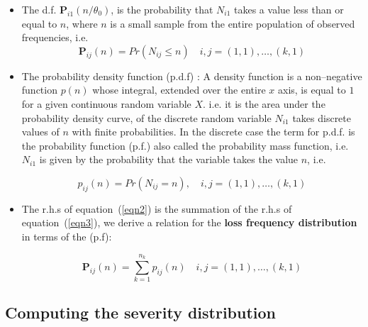\documentclass[]{DissertateUSU}
\begin{document}
\begin{itemize}
\item The d.f. \begin{math}\mathbf{P}_{i1}(n/\theta_0)  \end{math}, is the probability that $N_{i1}$ takes a value less than or equal to $n$, where $n$ is a small sample from the entire population of observed frequencies, i.e.
\singlespacing
\begin{equation}\label{eqn2}
\mathbf{P}_{ij}(n)=Pr \left(N_{ij}\leq n \right) \quad{i,j}= (1,1),\ldots, (k,1)
\end{equation}
\doublespacing

\item The probability density function (p.d.f) : A density function is a non--negative function $p(n)$ whose integral, extended over the entire $x$ axis, is equal to $1$ for a given continuous random variable $X$. i.e. it is the area under the probability density curve, of the discrete random variable $N_{i1}$ takes discrete values of $n$ with finite probabilities. In the discrete case the term for p.d.f. is the probability function (p.f.) also called the probability mass function, i.e. $N_{i1}$ is given by the probability that the variable takes the value $n$, i.e.

\singlespacing
\begin{equation}\label{eqn3}
p_{ij}(n)=Pr\left(N_{ij} = n\right), \quad{i,j}= (1,1),\ldots, (k,1) 
\end{equation} 
\doublespacing

\item The r.h.s of equation~(\ref{eqn2}) is the summation of the r.h.s of equation~(\ref{eqn3}), we derive a relation for the \textbf{loss frequency distribution} in terms of the (p.f): 

\singlespacing
\begin{equation}\label{eqn4} 
\mathbf{P}_{ij}(n)=\sum_{k=1}^{n_k} p_{ij}(n) \quad{i,j}= (1,1),\ldots, (k,1)
\end{equation}
\doublespacing

\end{itemize}

\subsection{Computing the severity distribution}
\end{document}
